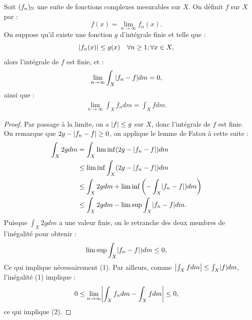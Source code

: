 \begin{thm}
Soit $(f_n)_\N$ une suite de fonctions complexes mesurables sur $X$. On définit $f$ sur $X$ par :
\[ f(x) = \lim_{n \to \infty} f_n(x) . \]
On suppose qu'il existe une fonction $g$ d'intégrale finie et telle que :
\[ \abs{f_n(x)} \leq g(x) \quad \forall n \geq 1 ; \forall x \in X , \]
alors l'intégrale de $f$ est finie, et :
\begin{align} \lim_{n \to \infty} \int_X \abs{f_n-f} dm = 0 , \end{align}
ainsi que :
\begin{align} \lim_{n \to \infty} \int_X f_n dm = \int_X f dm . \end{align}
\end{thm}

\begin{proof}
Par passage à la limite, on a $\abs{f} \leq g$ sur $X$, donc l'intégrale de $f$ est finie.
On remarque que $2g - \abs{f_n - f} \geq 0$, on applique le lemme de Fatou à cette suite :
\begin{align*}
\int_X 2g dm & = \int_X \liminf (2g - \abs{f_n - f}) dm \\
& \leq \liminf \int_X (2g - \abs{f_n - f}) dm \\
& \leq \int_X 2g dm + \liminf \left ( - \int_X \abs{f_n - f}) dm \right ) \\
& \leq \int_X 2g dm - \limsup \int_X \abs{f_n - f} dm .
\end{align*}
Puisque $\int_X 2g dm$ a une valeur finie, on le retranche des deux membres de l'inégalité pour obtenir :
\[ \limsup \int_X \abs{f_n - f}) dm \leq 0 , \]
Ce qui implique nécessairement (1). 
Par ailleurs, comme $\abs*{\int_X f dm} \leq \int_X \abs{f} dm$, l'inégalité (1) implique :
\[ 0 \leq \lim_{n \to \infty} \abs*{ \int_X f_n dm - \int_X f dm} \leq 0 , \]
ce qui implique (2).
\end{proof}

